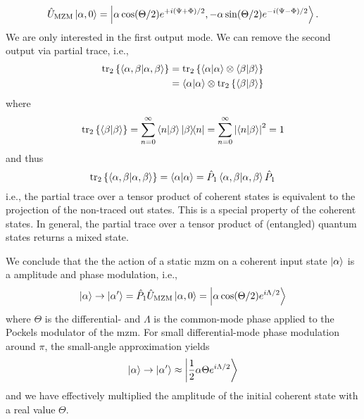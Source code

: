 \begin{equation}
	\hat{U}_\text{MZM}
	\ket{\alpha,0}
	=
	\ket{\alpha\cos(\Theta/2)e^{+i(\Psi+\Phi)/2},-\alpha\sin(\Theta/2)e^{-i(\Psi-\Phi)/2}}
	.
\end{equation}
We are only interested in the first output mode.
We can remove the second output via partial trace, i.e.,
\begin{equation}
	\begin{split}
		\tr_2\left\{
			\braket{\alpha,\beta}
		\right\}
		&=
		\tr_2\left\{
			\braket{\alpha}
			\otimes
			\braket{\beta}
		\right\}
		\\
		&=
		\braket{\alpha}
		\otimes
		\tr_2\left\{
			\braket{\beta}
		\right\}
	\end{split}
\end{equation}
where
\begin{equation}
	\tr_2\left\{
		\braket{\beta}
	\right\}
	=
	\sum_{n=0}^\infty
	\braket{n}{\beta}
	\ketbra{\beta}{n}
	=
	\sum_{n=0}^\infty
	\abs{\braket{n}{\beta}}^2
	=
	1
\end{equation}
and thus
\begin{equation}
	\tr_2\left\{
		\braket{\alpha,\beta}
	\right\}
	=
	\braket{\alpha}
	=
	\hat{P}_1
	\braket{\alpha,\beta}
	\hat{P}_1
\end{equation}
i.e., the partial trace over a tensor product of coherent states is equivalent to the projection of the non-traced out states.
This is a special property of the coherent states.
In general, the partial trace over a tensor product of (entangled) quantum states returns a mixed state.

We conclude that the the action of a static \gls{mzm} on a coherent input state $\ket{\alpha}$ is a amplitude and phase modulation, i.e.,
\begin{equation}
	\ket{\alpha}
	\to
	\ket{\alpha^\prime}
	=
	\hat{P}_1
	\hat{U}_\text{MZM}
	\ket{\alpha,0}
	=
	\ket{\alpha\cos(\Theta/2)e^{i\Lambda/2}}
	\label{eq:mzm_transform}
\end{equation}
where $\Theta$ is the differential- and $\Lambda$ is the common-mode phase applied to the Pockels modulator of the \gls{mzm}.
For small differential-mode phase modulation around $\pi$, the small-angle approximation yields
\begin{equation}
	\ket{\alpha}
	\to
	\ket{\alpha^\prime}
	\approx
	\ket{\frac{1}{2}\alpha\Theta e^{i\Lambda/2}}
\end{equation}
and we have effectively multiplied the amplitude of the initial coherent state with a real value $\Theta$.

